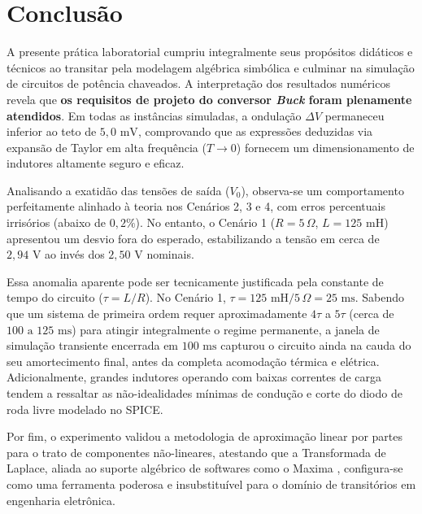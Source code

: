 
\chapter{Conclusão}

A presente prática laboratorial cumpriu integralmente seus propósitos didáticos e técnicos ao transitar pela modelagem algébrica simbólica e culminar na simulação de circuitos de potência chaveados. A interpretação dos resultados numéricos revela que \textbf{os requisitos de projeto do conversor \textit{Buck} foram plenamente atendidos}. Em todas as instâncias simuladas, a ondulação $\Delta V$ permaneceu inferior ao teto de $5,0\text{ mV}$, comprovando que as expressões deduzidas via expansão de Taylor em alta frequência ($T \to 0$) fornecem um dimensionamento de indutores altamente seguro e eficaz.

Analisando a exatidão das tensões de saída ($V_0$), observa-se um comportamento perfeitamente alinhado à teoria nos Cenários 2, 3 e 4, com erros percentuais irrisórios (abaixo de $0,2\%$). No entanto, o Cenário 1 ($R = 5\,\Omega$, $L = 125\text{ mH}$) apresentou um desvio fora do esperado, estabilizando a tensão em cerca de $2,94\text{ V}$ ao invés dos $2,50\text{ V}$ nominais.

Essa anomalia aparente pode ser tecnicamente justificada pela constante de tempo do circuito ($\tau = L/R$). No Cenário 1, $\tau = 125\text{ mH} / 5\,\Omega = 25\text{ ms}$. Sabendo que um sistema de primeira ordem requer aproximadamente $4\tau$ a $5\tau$ (cerca de $100\text{ a }125\text{ ms}$) para atingir integralmente o regime permanente, a janela de simulação transiente encerrada em $100\text{ ms}$ capturou o circuito ainda na cauda do seu amortecimento final, antes da completa acomodação térmica e elétrica. Adicionalmente, grandes indutores operando com baixas correntes de carga tendem a ressaltar as não-idealidades mínimas de condução e corte do diodo de roda livre modelado no SPICE.

Por fim, o experimento validou a metodologia de aproximação linear por partes para o trato de componentes não-lineares, atestando que a Transformada de Laplace, aliada ao suporte algébrico de softwares como o Maxima \cite{maxima}, configura-se como uma ferramenta poderosa e insubstituível para o domínio de transitórios em engenharia eletrônica.